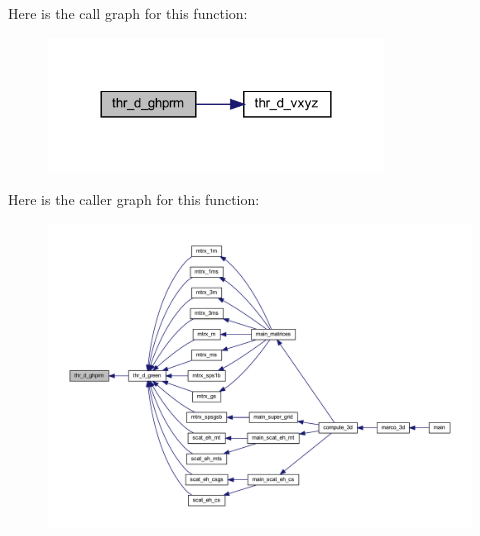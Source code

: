 Here is the call graph for this function\+:
\nopagebreak
\begin{figure}[H]
\begin{center}
\leavevmode
\includegraphics[width=252pt]{Marco_8f90_a10048a9736ad8beefbadc2a0bc43f675_cgraph}
\end{center}
\end{figure}
Here is the caller graph for this function\+:
\nopagebreak
\begin{figure}[H]
\begin{center}
\leavevmode
\includegraphics[width=350pt]{Marco_8f90_a10048a9736ad8beefbadc2a0bc43f675_icgraph}
\end{center}
\end{figure}
\mbox{\label{Marco_8f90_a0296c656f8f4846170724584ffa24f15}} 
